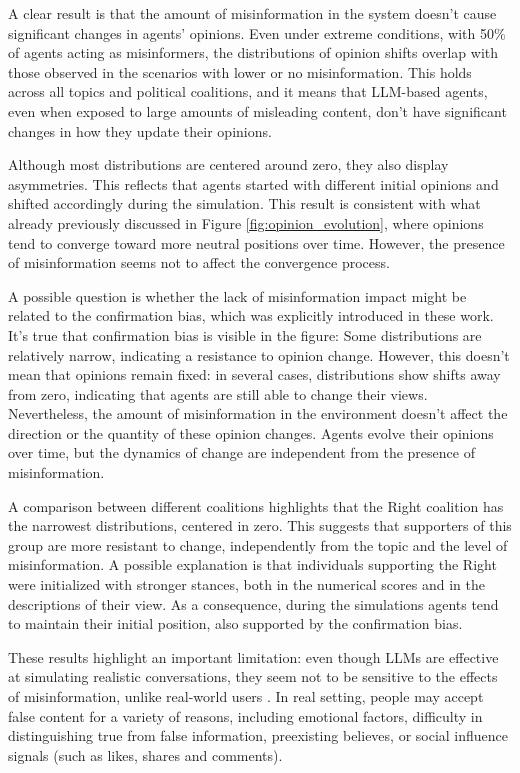 A clear result is that the amount of misinformation in the system doesn't cause significant changes in agents' opinions.
Even under extreme conditions, with 50\% of agents acting as misinformers, the distributions of opinion shifts overlap with those observed in the scenarios with lower or no misinformation.
This holds across all topics and political coalitions, and it means that LLM-based agents, even when exposed to large amounts of misleading content, don't have significant changes in how they update their opinions.

Although most distributions are centered around zero, they also display asymmetries.
This reflects that agents started with different initial opinions and shifted accordingly during the simulation.
This result is consistent with what already previously discussed in Figure \ref{fig:opinion_evolution}, where opinions tend to converge toward more neutral positions over time.
However, the presence of misinformation seems not to affect the convergence process.

A possible question is whether the lack of misinformation impact might be related to the confirmation bias, which was explicitly introduced in these work.
It's true that confirmation bias is visible in the figure: Some distributions are relatively narrow, indicating a resistance to opinion change.
However, this doesn't mean that opinions remain fixed: in several cases, distributions show shifts away from zero, indicating that agents are still able to change their views.
Nevertheless, the amount of misinformation in the environment doesn't affect the direction or the quantity of these opinion changes. Agents evolve their opinions over time, but the dynamics of change are independent from the presence of misinformation.

A comparison between different coalitions highlights that the Right coalition has the narrowest distributions, centered in zero.
This suggests that supporters of this group are more resistant to change, independently from the topic and the level of misinformation.
A possible explanation is that individuals supporting the Right were initialized with stronger stances, both in the numerical scores and in the descriptions of their view. 
As a consequence, during the simulations agents tend to maintain their initial position, also supported by the confirmation bias.

These results highlight an important limitation: even though LLMs are effective at simulating realistic conversations, they seem not to be sensitive to the effects of misinformation, unlike real-world users \cite{aimeur2023fake}.
In real setting, people may accept false content for a variety of reasons, including emotional factors, difficulty in distinguishing true from false information, preexisting believes, or social influence signals (such as likes, shares and comments).

